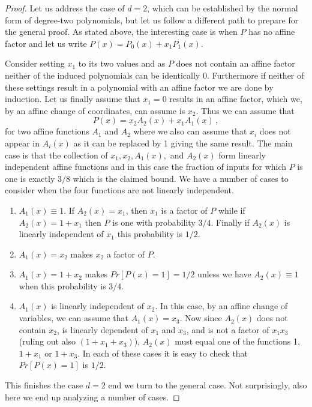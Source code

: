 \documentclass[10pt]{article}
\theoremstyle{definition}
\numberwithin{equation}{section}
\begin{document}
\begin{proof}
Let us address the case of $d=2$, which can
be established by the normal form of 
%
degree-two 
polynomials, but let us follow a
different path to prepare for the general proof.
As stated above, the interesting case is
when $P$ has no affine factor and let
us write $P(x)=P_0(x)+x_1P_1(x)$.

Consider setting $x_1$ to its two values and as
$P$ does not contain an affine factor neither
of the induced polynomials can be identically 0.  Furthermore
if neither of these settings result in a polynomial
with an affine factor we are done by
induction.  Let us finally assume that $x_1=0$
results in an affine factor, which we, by an
affine change of coordinates, can assume is $x_2$.
Thus we can assume that 
$$
P(x)= x_2 A_2(x)+x_1A_1(x)\,,
$$
for two affine functions $A_1$ and $A_2$ where
we also can assume that $x_i$ does not appear in $A_i(x)$ as it
can be replaced by 1 giving the same result.
The main case is that the collection of $x_1,x_2, A_1(x),$
and $A_2(x)$ form linearly independent affine functions and
in this case the fraction of inputs for which
$P$ is one is exactly $3/8$ which is the claimed bound.
We have a number of cases to consider when the four
functions are not linearly independent.

\begin{enumerate}
\item $A_1(x) \equiv 1$.  If $A_2(x)=x_1$, then $x_1$ is a factor
of $P$ while if $A_2(x)=1+x_1$ then $P$ is one with
probability $3/4$. Finally if $A_2(x)$ is linearly independent
of $x_1$ this probability is $1/2$.  

\item $A_1(x)=x_2$ makes $x_2$ a factor of $P$.

\item $A_1(x)=1+x_2$ makes $Pr[P(x)=1]=1/2$ unless we
have $A_2(x) \equiv 1$ when this probability is $3/4$.

\item $A_1(x)$ is linearly independent of $x_2$.  In this case,
by an affine change of variables, we can assume that $A_1(x)=x_3$.
Now since $A_2(x)$ does not contain $x_2$, is linearly
dependent of $x_1$ and $x_3$, and is not a factor
of $x_1x_3$ (ruling out also $(1+x_1+x_3)$), 
$A_2(x)$ must equal one of the functions 1, $1+x_1$
or $1+x_3$.  In each of these cases it is easy
to check that $Pr[P(x)=1]$ is $1/2$.

\end{enumerate}
This finishes the case $d=2$ end we turn to the
general case.  Not surprisingly, also here we
end up analyzing a number of cases.


\end{proof}
\end{document}
